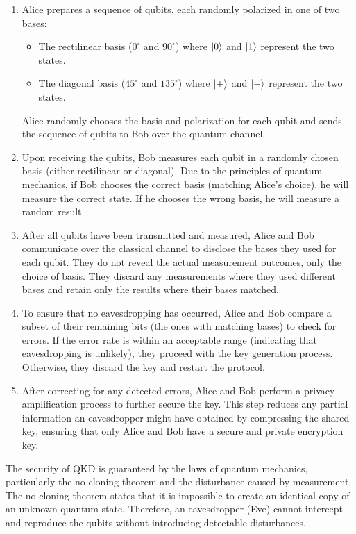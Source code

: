 \documentclass{article}
\begin{document}
	\begin{enumerate}
		\item Alice prepares a sequence of qubits, each randomly polarized in one of two bases:
			\begin{itemize}
				\item The rectilinear basis (\( 0^\circ \) and \( 90^\circ \)) where \( \ket{0} \) and \( \ket{1} \) represent the two states.
				\item The diagonal basis (\( 45^\circ \) and \( 135^\circ \)) where \( \ket{+} \) and \( \ket{-} \) represent the two states.
			\end{itemize}
			Alice randomly chooses the basis and polarization for each qubit and sends the sequence of qubits to Bob over the quantum channel.

		\item Upon receiving the qubits, Bob measures each qubit in a randomly chosen basis (either rectilinear or diagonal). Due to the principles of quantum mechanics, if Bob chooses the correct basis (matching Alice’s choice), he will measure the correct state. If he chooses the wrong basis, he will measure a random result.

		\item After all qubits have been transmitted and measured, Alice and Bob communicate over the classical channel to disclose the bases they used for each qubit. They do not reveal the actual measurement outcomes, only the choice of basis. They discard any measurements where they used different bases and retain only the results where their bases matched.

		\item To ensure that no eavesdropping has occurred, Alice and Bob compare a subset of their remaining bits (the ones with matching bases) to check for errors. If the error rate is within an acceptable range (indicating that eavesdropping is unlikely), they proceed with the key generation process. Otherwise, they discard the key and restart the protocol.

		\item After correcting for any detected errors, Alice and Bob perform a privacy amplification process to further secure the key. This step reduces any partial information an eavesdropper might have obtained by compressing the shared key, ensuring that only Alice and Bob have a secure and private encryption key.
	\end{enumerate}

	The security of QKD is guaranteed by the laws of quantum mechanics, particularly the no-cloning theorem and the disturbance caused by measurement. The no-cloning theorem states that it is impossible to create an identical copy of an unknown quantum state. Therefore, an eavesdropper (Eve) cannot intercept and reproduce the qubits without introducing detectable disturbances.
\end{document}

